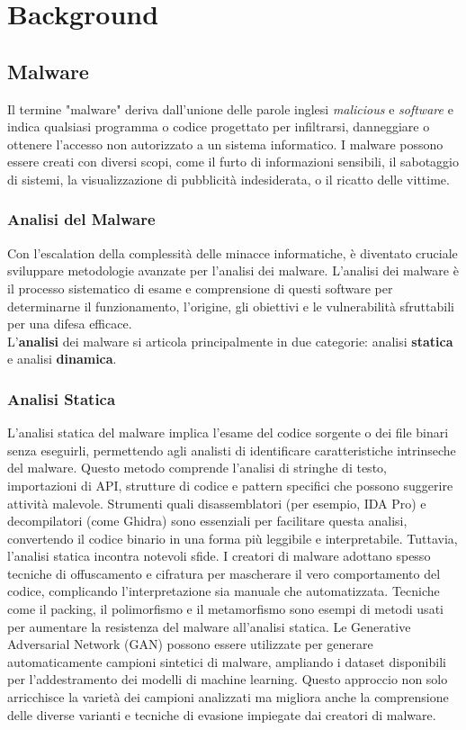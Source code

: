 \chapter{Background}
\label{cap:background}

\section{Malware}
Il termine "malware" deriva dall'unione delle parole inglesi \emph{malicious} e \emph{software} e indica qualsiasi programma o codice progettato per infiltrarsi, danneggiare o ottenere l'accesso non autorizzato a un sistema informatico. I malware possono essere creati con diversi scopi, come il furto di informazioni sensibili, il sabotaggio di sistemi, la visualizzazione di pubblicità indesiderata, o il ricatto delle vittime.

\subsection{Analisi del Malware}
Con l'escalation della complessità delle minacce informatiche, è diventato cruciale sviluppare metodologie avanzate per l'analisi dei malware. L'analisi dei malware è il processo sistematico di esame e comprensione di questi software per determinarne il funzionamento, l'origine, gli obiettivi e le vulnerabilità sfruttabili per una difesa efficace. \\ 
L'\textbf{analisi} dei malware si articola principalmente in due categorie: analisi \textbf{statica} e analisi \textbf{dinamica}.

\subsection{Analisi Statica}
L'analisi statica del malware implica l'esame del codice sorgente o dei file binari senza eseguirli, permettendo agli analisti di identificare caratteristiche intrinseche del malware. Questo metodo comprende l'analisi di stringhe di testo, importazioni di API, strutture di codice e pattern specifici che possono suggerire attività malevole. Strumenti quali disassemblatori (per esempio, IDA Pro) e decompilatori (come Ghidra) sono essenziali per facilitare questa analisi, convertendo il codice binario in una forma più leggibile e interpretabile.
Tuttavia, l'analisi statica incontra notevoli sfide. I creatori di malware adottano spesso tecniche di offuscamento e cifratura per mascherare il vero comportamento del codice, complicando l'interpretazione sia manuale che automatizzata. Tecniche come il packing, il polimorfismo e il metamorfismo sono esempi di metodi usati per aumentare la resistenza del malware all'analisi statica.
Le Generative Adversarial Network (GAN) possono essere utilizzate per generare automaticamente campioni sintetici di malware, ampliando i dataset disponibili per l'addestramento dei modelli di machine learning. Questo approccio non solo arricchisce la varietà dei campioni analizzati ma migliora anche la comprensione delle diverse varianti e tecniche di evasione impiegate dai creatori di malware.

